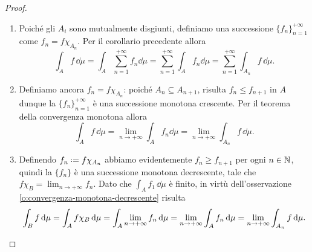 \begin{proof}
	\begin{enumerate}
		\item Poich\'e gli $A_i$ sono mutualmente disgiunti, definiamo una successione $\{f_n\}_{n=1}^{+\infty}$ come $f_n=f\chi_{A_n}$.
			Per il corollario precedente allora
			\begin{equation}
				\int_Af\,\dd\mu=\int_A\sum_{n=1}^{+\infty}f_n\dd\mu=\sum_{n=1}^{+\infty}\int_Af_n\dd\mu=\sum_{n=1}^{+\infty}\int_{A_n}f\,\dd\mu.
			\end{equation}
		\item Definiamo ancora $f_n=f\chi_{A_n}$: poich\'e $A_n\subseteq A_{n+1}$, risulta $f_n\leq f_{n+1}$ in $A$ dunque la $\{f_n\}_{n=1}^{+\infty}$ è una successione monotona crescente.
			Per il teorema della convergenza monotona allora
			\begin{equation}
				\int_Af\,\dd\mu=\lim_{n\to+\infty}\int_Af_n\dd\mu=\lim_{n\to+\infty}\int_{A_n}f\,\dd\mu.
			\end{equation}
		\item Definendo $f_n\defeq f\chi_{A_n}$ abbiamo evidentemente $f_n\ge f_{n+1}$ per ogni $n\in\mathbb{N}$, quindi la $\{f_n\}$ è una successione monotona decrescente, tale che $f\chi_B=\lim_{n\to+\infty}f_n$.
			Dato che $\int_Af_1\,\dd\mu$ è finito, in virtù dell'osservazione \ref{o:convergenza-monotona-decrescente} risulta
			\begin{equation}
				\int_Bf\,\textup{d}\mu=\int_Af\chi_B\,\textup{d}\mu=\int_A\lim_{n\to+\infty}f_n\,\textup{d}\mu=\lim_{n\to+\infty}\int_Af_n\,\textup{d}\mu=\lim_{n\to+\infty}\int_{A_n}f\,\textup{d}\mu.\qedhere
			\end{equation}
	\end{enumerate}
\end{proof}

